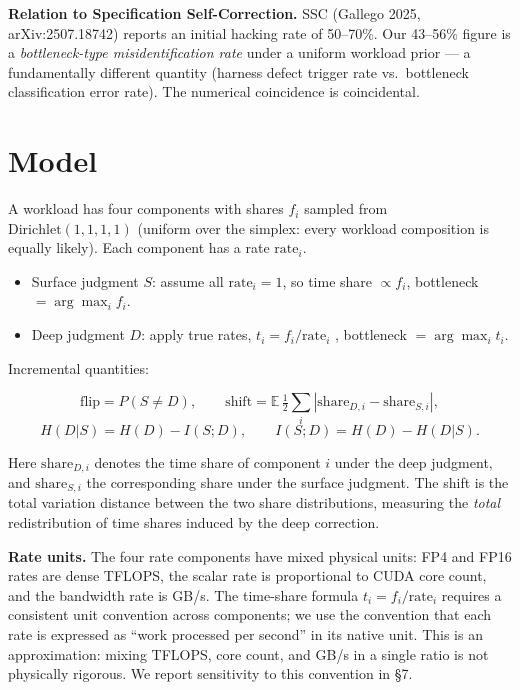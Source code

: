 \documentclass[10pt]{article}
\providecommand{\tightlist}{\relax}
\begin{document}
\textbf{Relation to Specification Self-Correction.} SSC (Gallego 2025, arXiv:2507.18742) reports an initial hacking rate of 50--70\%. Our 43--56\% figure is a \emph{bottleneck-type misidentification rate} under a uniform workload prior --- a fundamentally different quantity (harness defect trigger rate vs.\ bottleneck classification error rate). The numerical coincidence is coincidental.



\section{Model}\label{model}

A workload has four components with shares $f_i$ sampled from $\mathrm{Dirichlet}(1,1,1,1)$ (uniform over the simplex: every workload composition is equally likely). Each component has a rate $\mathrm{rate}_i$.

\begin{itemize}
\tightlist
\item
  Surface judgment $S$: assume all $\mathrm{rate}_i=1$, so time share $\propto f_i$, bottleneck $=\arg\max_i f_i$.
\item
  Deep judgment $D$: apply true rates, $t_i=f_i/\mathrm{rate}_i$ \citep{rooflineTime2020}, bottleneck $=\arg\max_i t_i$.
\end{itemize}

Incremental quantities:

\[
\text{flip}=P(S\neq D),\qquad \text{shift}=\mathbb{E}\,\tfrac{1}{2}\!\sum_i|\mathrm{share}_{D,i}-\mathrm{share}_{S,i}|,
\] \[
H(D|S)=H(D)-I(S;D),\qquad I(S;D)=H(D)-H(D|S).
\]

Here $\mathrm{share}_{D,i}$ denotes the time share of component $i$ under the deep judgment, and $\mathrm{share}_{S,i}$ the corresponding share under the surface judgment. The shift is the total variation distance between the two share distributions, measuring the \emph{total} redistribution of time shares induced by the deep correction.

\textbf{Rate units.} The four rate components have mixed physical units: FP4 and FP16 rates are dense TFLOPS, the scalar rate is proportional to CUDA core count, and the bandwidth rate is GB/s. The time-share formula $t_i=f_i/\mathrm{rate}_i$ requires a consistent unit convention across components; we use the convention that each rate is expressed as ``work processed per second'' in its native unit. This is an approximation: mixing TFLOPS, core count, and GB/s in a single ratio is not physically rigorous. We report sensitivity to this convention in \S7.
\end{document}
